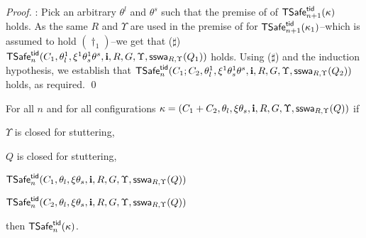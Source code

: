 \begin{proof}
%
%


: 
Pick an arbitrary $\theta^l$ and $\theta^s$ such that the 
premise of  of $\safe_{n+1}(\kappa)$ holds. 
As the same $R$ and $\Upsilon$ are used in the premise of 
 for $\safe_{n+1}(\kappa_1)$--which is assumed to 
hold $(\dag_1)$--we get that ($\sharp$)
$\safe_n(C_1,\theta^1_l,\xi^1\theta^1_s\theta^s,\intp,R,G,\Upsilon, \sswa{Q_1}{R}{\Upsilon})$
holds. 
Using ($\sharp$) and the induction hypothesis, we establish that 
$\safe_n(C_1;C_2, \theta^1_l,\xi^1\theta^1_s\theta^s,\intp,R,G,\Upsilon, \sswa{Q_2}{R}{\Upsilon})$
holds, as required.
\qed\end{proof}

\begin{lemma}[Choice]\label{lem:choice}
For all $n$ and for all 
configurations $\kappa = (C_1 + C_2,\theta_l,\xi\theta_s,\intp,R,G,\Upsilon, \sswa{Q}{R}{\Upsilon})$
if
\begin{compactenum}[(i)]
\item 
$\Upsilon$ is closed for stuttering, 
\item 
$Q$ is closed for stuttering, 
\item
$\safe_n(C_1,\theta_l,\xi\theta_s,\intp,R,G,\Upsilon,\sswa{Q}{R}{\Upsilon})$
\item
$\safe_n(C_2,\theta_l,\xi\theta_s,\intp,R,G,\Upsilon,\sswa{Q}{R}{\Upsilon})$
\end{compactenum}
then 
$\safe_n(\kappa)$.
\end{lemma}


